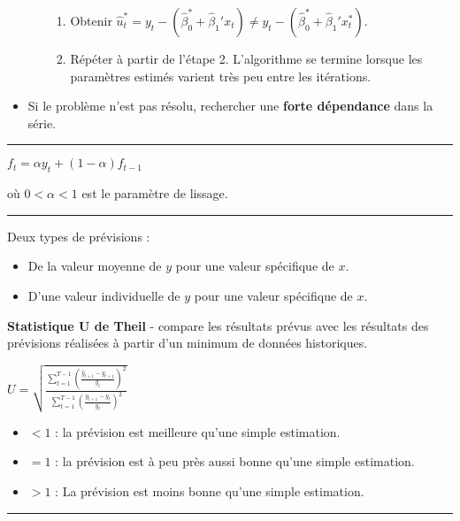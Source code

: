 \begin{f}[Correction]
\begin{itemize}[leftmargin=*]
\begin{itemize}[leftmargin=*]
\begin{enumerate}[leftmargin=*]
	\item Obtenir $\hat{u}_{t}^{*} = y_{t} - (\hat{\beta}_{0}^{*} + \hat{\beta}_{1}' x_{t}) \neq y_ {t} - (\hat{\beta}_{0}^{*} + \hat{\beta}_{1}' x_{t}^{*})$.
	\item Répéter à partir de l'étape 2. L'algorithme se termine lorsque les paramètres estimés varient très peu entre les itérations.
\end{enumerate}
\end{itemize}

\item Si le problème n'est pas résolu, rechercher une \textbf{forte dépendance} dans la série.
\end{itemize}

\end{f}  
\columnbreak

\hrule

\begin{f}

\begin{center}
	$f_{t} = \alpha y_{t} + (1 - \alpha) f_{t - 1}$
\end{center}

où $0 < \alpha < 1$ est le paramètre de lissage.

\end{f}  \hrule

\begin{f}[Prévisions]

Deux types de prévisions :

\begin{itemize}[leftmargin=*]
	\item De la valeur moyenne de $y$ pour une valeur spécifique de $x$.
	\item D'une valeur individuelle de $y$ pour une valeur spécifique de $x$.
\end{itemize}

\textbf{Statistique U de Theil} - compare les résultats prévus avec les résultats des prévisions réalisées à partir d'un minimum de données historiques.

\begin{center}
	$U = \sqrt{\frac{\sum_{t=1}^{T-1} \left( \frac{\hat{y}_{t+1} - y_{t+1}}{y_t} \right)^2}{\sum_{t=1}^{T-1} \left( \frac{y_ {t+1} - y_t}{y_t} \right)^2}}$
\end{center}

\begin{itemize}[leftmargin=*]
	\item $< 1$ : la prévision est meilleure qu'une simple estimation.
	\item $= 1$ : la prévision est à peu près aussi bonne qu'une simple estimation.
	\item $> 1$ : La prévision est moins bonne qu'une simple estimation.
\end{itemize}



\end{f}  \hrule

